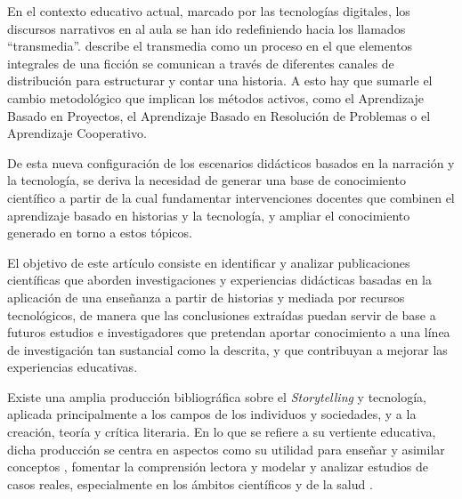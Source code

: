 En el contexto educativo actual, marcado por las tecnologías digitales,
los discursos narrativos en al aula se han ido redefiniendo hacia los
llamados \enquote{transmedia}. \textcite{dudacek_transmedia_2015} describe el transmedia como un proceso en el que elementos integrales de una ficción se comunican a través de diferentes canales de distribución para estructurar y contar una historia. A esto hay que sumarle el cambio metodológico que implican los métodos activos, como el Aprendizaje Basado en Proyectos, el
Aprendizaje Basado en Resolución de Problemas o el Aprendizaje
Cooperativo.

De esta nueva configuración de los escenarios didácticos basados en la
narración y la tecnología, se deriva la necesidad de generar una base de
conocimiento científico a partir de la cual fundamentar intervenciones
docentes que combinen el aprendizaje basado en historias y la
tecnología, y ampliar el conocimiento generado en torno a estos tópicos.

El objetivo de este artículo consiste en identificar y analizar
publicaciones científicas que aborden investigaciones y experiencias
didácticas basadas en la aplicación de una enseñanza a partir de
historias y mediada por recursos tecnológicos, de manera que las
conclusiones extraídas puedan servir de base a futuros estudios e
investigadores que pretendan aportar conocimiento a una línea de
investigación tan sustancial como la descrita, y que contribuyan a
mejorar las experiencias educativas.

Existe una amplia producción bibliográfica sobre el \emph{Storytelling}
y tecnología, aplicada principalmente a los campos de los individuos y
sociedades, y a la creación, teoría y crítica literaria. En lo que se
refiere a su vertiente educativa, dicha producción se centra en aspectos
como su utilidad para enseñar y asimilar conceptos \cite{alismail2015integrate,sadik2008digital}, fomentar la comprensión lectora \cite{al-shaye2021digital,bakar2019digital} y modelar y analizar estudios de casos reales, especialmente en
los ámbitos científicos y de la salud \cite{moreau_digital_2018,open2022digital,thompson_communicating_2018}.

